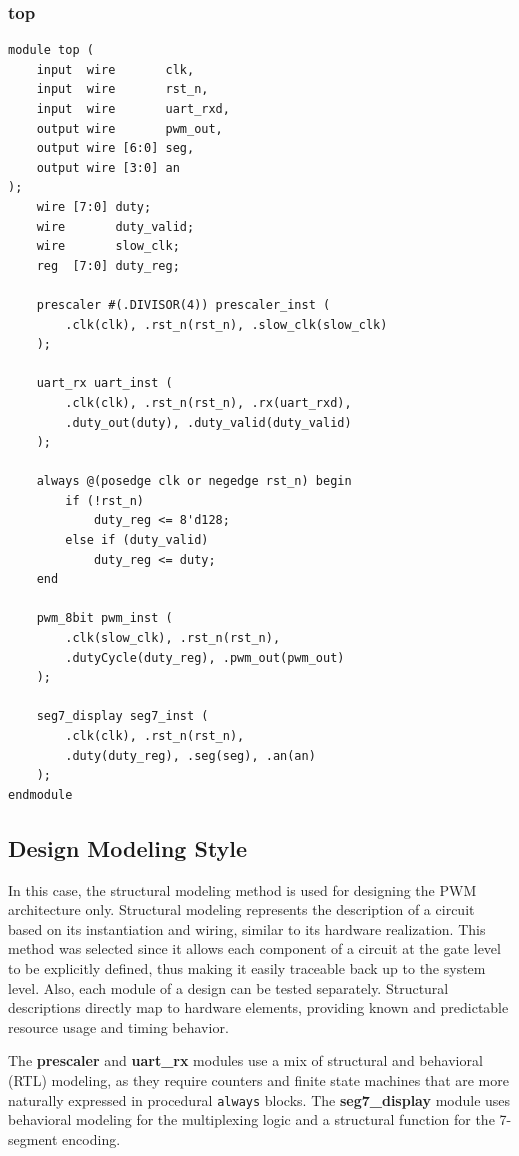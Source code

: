 \documentclass[12pt,a4paper]{article}
\begin{document}
\subsubsection*{top}
\begin{lstlisting}
module top (
    input  wire       clk,
    input  wire       rst_n,
    input  wire       uart_rxd,
    output wire       pwm_out,
    output wire [6:0] seg,
    output wire [3:0] an
);
    wire [7:0] duty;
    wire       duty_valid;
    wire       slow_clk;
    reg  [7:0] duty_reg;

    prescaler #(.DIVISOR(4)) prescaler_inst (
        .clk(clk), .rst_n(rst_n), .slow_clk(slow_clk)
    );

    uart_rx uart_inst (
        .clk(clk), .rst_n(rst_n), .rx(uart_rxd),
        .duty_out(duty), .duty_valid(duty_valid)
    );

    always @(posedge clk or negedge rst_n) begin
        if (!rst_n)
            duty_reg <= 8'd128;
        else if (duty_valid)
            duty_reg <= duty;
    end

    pwm_8bit pwm_inst (
        .clk(slow_clk), .rst_n(rst_n),
        .dutyCycle(duty_reg), .pwm_out(pwm_out)
    );

    seg7_display seg7_inst (
        .clk(clk), .rst_n(rst_n),
        .duty(duty_reg), .seg(seg), .an(an)
    );
endmodule
\end{lstlisting}

\subsection{Design Modeling Style}

In this case, the structural modeling method is used for designing the PWM architecture only. Structural modeling represents the description of a circuit based on its instantiation and wiring, similar to its hardware realization. This method was selected since it allows each component of a circuit at the gate level to be explicitly defined, thus making it easily traceable back up to the system level. Also, each module of a design can be tested separately. Structural descriptions directly map to hardware elements, providing known and predictable resource usage and timing behavior.

The \textbf{prescaler} and \textbf{uart\_rx} modules use a mix of structural and behavioral (RTL) modeling, as they require counters and finite state machines that are more naturally expressed in procedural \texttt{always} blocks. The \textbf{seg7\_display} module uses behavioral modeling for the multiplexing logic and a structural function for the 7-segment encoding.
\end{document}
